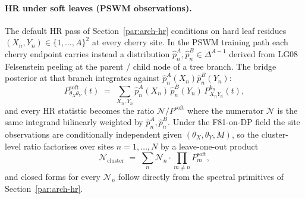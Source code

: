 \paragraph{HR under soft leaves (PSWM observations).}
\label{par:arch-hr-soft}
The default HR pass of Section~\ref{par:arch-hr} conditions on hard leaf
residues $(X_n, Y_n) \in \{1, \dots, A\}^2$ at every cherry site. In the
PSWM training path each cherry
endpoint carries instead a distribution $\hat p^{A}_n, \hat p^{B}_n \in
\Delta^{A-1}$ derived from LG08 Felsenstein peeling at the parent /
child node of a tree branch. The bridge posterior at that branch
integrates against $\hat p^{A}_n(X_n)\hat p^{B}_n(Y_n)$:
\[
  P^{\mathrm{soft}}_{\theta_X\theta_Y}(t)
    \;=\; \sum_{X_n, Y_n} \hat p^{A}_n(X_n)\,\hat p^{B}_n(Y_n)\,
          P^{k_n}_{X_n Y_n}(t),
\]
and every HR statistic becomes the ratio $\mathcal{N} / P^{\mathrm{soft}}$
where the numerator $\mathcal{N}$ is the same integrand bilinearly weighted
by $\hat p^{A}_n, \hat p^{B}_n$. Under the F81-on-DP field the site
observations are conditionally independent given
$(\theta_X, \theta_Y, M)$, so the cluster-level ratio factorises over
sites $n = 1, \dots, N$ by a
leave-one-out product
\[
  \mathcal{N}_{\mathrm{cluster}}
    \;=\; \sum_n
      \mathcal{N}_n \cdot \!\prod_{m \ne n}\! P^{\mathrm{soft}}_m,
\]
and closed forms for every $\mathcal{N}_n$ follow directly from the
spectral primitives of Section~\ref{par:arch-hr}.

